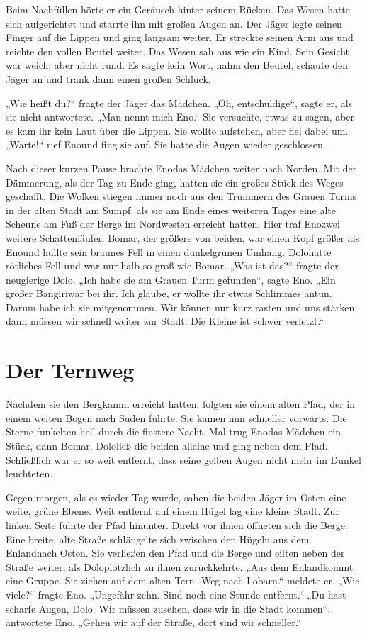 \documentclass[12pt,a4paper,onecolumn,twoside,ngerman]{book}
\newcommand{\Tern}{Tern }
\newcommand{\Bangiri}{Bangiri}
\newcommand{\Enland}{Enland}
\newcommand{\Schattenjager}{Schattenläufer}
\newcommand{\Eno}{Eno}
\newcommand{\Bomar}{Bomar}
\newcommand{\Do}{Dolo}
\newcommand{\Lobarn}{Lobarn}
\begin{document}
Beim Nachfüllen hörte er ein Geräusch hinter seinem Rücken. Das Wesen hatte sich aufgerichtet und starrte ihn mit großen Augen an. Der Jäger legte seinen Finger auf die Lippen und ging langsam weiter. Er streckte seinen Arm aus und reichte den vollen Beutel weiter. Das Wesen sah aus wie ein Kind. Sein Gesicht war weich, aber nicht rund. Es sagte kein Wort, nahm den Beutel, schaute den Jäger an und trank dann einen großen Schluck. 

„Wie heißt du?“ fragte der Jäger das Mädchen. „Oh, entschuldige“, sagte er, als sie nicht antwortete. „Man nennt mich \Eno.“ Sie versuchte, etwas zu sagen, aber es kam ihr kein Laut über die Lippen. Sie wollte aufstehen, aber fiel dabei um. „Warte!“ rief \Eno und fing sie auf. Sie hatte die Augen wieder geschlossen.

Nach dieser kurzen Pause brachte \Eno das Mädchen weiter nach Norden. Mit der Dämmerung, als der Tag zu Ende ging, hatten sie ein großes Stück des Weges geschafft. Die Wolken stiegen immer noch aus den Trümmern des Grauen Turms in der alten Stadt am Sumpf, als sie am Ende eines weiteren Tages eine alte Scheune am Fuß der Berge im Nordwesten erreicht hatten. Hier traf \Eno zwei weitere \Schattenjager. \Bomar, der größere von beiden, war einen Kopf größer als \Eno und hüllte sein braunes Fell in einen dunkelgrünen Umhang. \Do hatte rötliches Fell und war nur halb so groß wie \Bomar. 
„Was ist das?“ fragte der neugierige \Do. 
„Ich habe sie am Grauen Turm gefunden“, sagte \Eno. „Ein großer \Bangiri war bei ihr. Ich glaube, er wollte ihr etwas Schlimmes antun. Darum habe ich sie mitgenommen. Wir können nur kurz rasten und uns stärken, dann müssen wir schnell weiter zur Stadt. Die Kleine ist schwer verletzt.“

\section{Der Ternweg}
Nachdem sie den Bergkamm erreicht hatten, folgten sie einem alten Pfad, der in einem weiten Bogen nach Süden führte. Sie kamen nun schneller vorwärts. Die Sterne funkelten hell durch die finstere Nacht. Mal trug \Eno das Mädchen ein Stück, dann \Bomar. \Do ließ die beiden alleine und ging neben dem Pfad. Schließlich war er so weit entfernt, dass seine gelben Augen nicht mehr im Dunkel leuchteten.

Gegen morgen, als es wieder Tag wurde, sahen die beiden Jäger im Osten eine weite, grüne Ebene. Weit entfernt auf einem Hügel lag eine kleine Stadt. Zur linken Seite führte der Pfad hinunter. Direkt vor ihnen öffneten sich die Berge. Eine breite, alte Straße schlängelte sich zwischen den Hügeln aus dem \Enland nach Osten. Sie verließen den Pfad und die Berge und eilten neben der Straße weiter, als \Do plötzlich zu ihnen zurückkehrte. „Aus dem \Enland kommt eine Gruppe. Sie ziehen auf dem alten \Tern{-Weg} nach \Lobarn.“ meldete er. „Wie viele?“ fragte \Eno. „Ungefähr zehn. Sind noch eine Stunde entfernt.“ „Du hast scharfe Augen, \Do. Wir müssen zusehen, dass wir in die Stadt kommen“, antwortete \Eno. „Gehen wir auf der Straße, dort sind wir schneller.“
\end{document}
